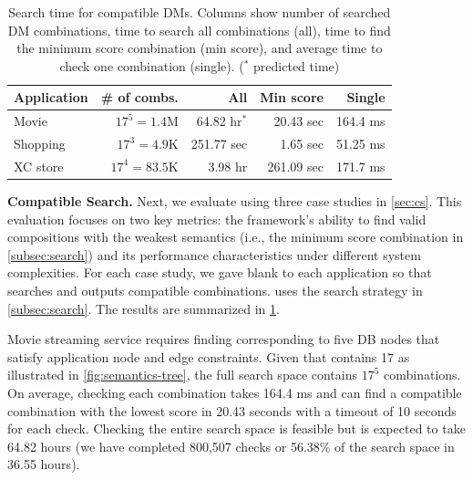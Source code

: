 \begin{table}
	\center
	\small
	\caption{Search time for compatible DMs. Columns show number of searched DM combinations, time to search all combinations (all), time to find the minimum score combination (min score), and average time to check one combination (single).  ($^*$ predicted time)}
	\label{tbl:searchtime}
	\begin{tabular}{ |l|r|r|r|r| }
		\hline
		Application & \# of combs. & All & Min score & Single \\
		\hline
		Movie    & $17^5=1.4\textrm{M}$ & 64.82 hr$^*$ & 20.43 sec  & 164.4 ms\\
		Shopping & $17^3=4.9\textrm{K}$ &251.77 sec   & 1.65 sec   & 51.25 ms \\
		XC store & $17^4=83.5\textrm{K}$ &3.98 hr      & 261.09 sec & 171.7 ms\\
		\hline
	\end{tabular}
\end{table}
\textbf{Compatible \sysmod{} Search.} Next, we evaluate \sysname{} using
three case studies in \cref{sec:cs}.
This evaluation focuses on two key metrics: the framework's ability to
find valid compositions with the weakest semantics (i.e., the minimum score combination in \cref{subsec:search}) and its
performance characteristics under different system complexities.
%
For each case study, we gave blank \sysmods{} to each application
so that \sysname{} searches and outputs compatible \sysmod{} combinations.
\sysname{} uses the search strategy in \cref{subsec:search}. The results are summarized in \cref{tbl:searchtime}.

Movie streaming service requires finding \sysmods{} corresponding to
five DB nodes that satisfy application node and edge constraints.
Given that \sysname{} contains 17 \sysmods{} as illustrated in
\cref{fig:semantics-tree}, the full search space contains
$17^5$ combinations. On average, checking each combination
takes 164.4 ms and can find a compatible combination with the lowest
score in 20.43 seconds with a timeout of 10 seconds for each check.
Checking the entire search space is feasible but is expected to take
64.82 hours (we have completed 800,507 checks or 56.38\% of the search space
in 36.55 hours).

